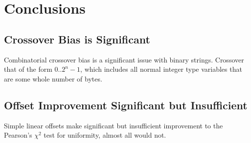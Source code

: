 \chapter{Conclusions}

\section{Crossover Bias is Significant}
Combinatorial crossover bias is a significant issue with binary strings.  Crossover that of the form $0..2^n -1$, which includes all normal integer type variables that are some whole number of bytes.

\section{Offset Improvement Significant but Insufficient}
Simple linear offsets make significant but insufficient improvement to the Pearson's $\chi^2$ test for uniformity, almost all would not.  


